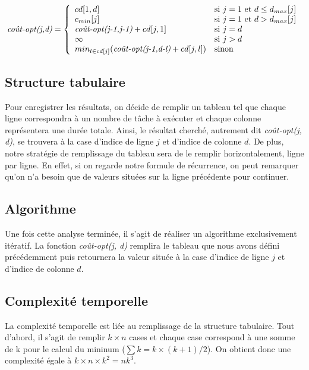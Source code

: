 \documentclass[a4paper, titlepage]{article}
\begin{document}
		$$
		\mbox{\emph{coût-opt(j,d)}} = \left\{
		    \begin{array}{ll}
		        cd[1,d] & \mbox{si } j=1 \mbox{ et } d \le d_{max}[j] \\
		        c_{min}[j] & \mbox{si } j=1 \mbox{ et } d > d_{max}[j] \\
		        \mbox{\emph{coût-opt(j-1,j-1)}} + cd[j,1] & \mbox{si } j=d \\
		        \infty & \mbox{si } j>d \\
		        min_{l \in cd[j]}(\mbox{\emph{coût-opt(j-1,d-l)}} + cd[j,l]) & \mbox{sinon} \\
		    \end{array}
		\right.
		$$
		
	\subsection{Structure tabulaire}
		Pour enregistrer les résultats, on décide de remplir un tableau tel que chaque ligne correspondra à un nombre de tâche à exécuter et chaque colonne représentera une durée totale.
		Ainsi, le résultat cherché, autrement dit \emph{coût-opt(j, d)}, se trouvera à la case d'indice de ligne $j$ et d'indice de colonne $d$.
		De plus, notre stratégie de remplissage du tableau sera de le remplir horizontalement, ligne par ligne.
		En effet, si on regarde notre formule de récurrence, on peut remarquer qu'on n'a besoin que de valeurs situées sur la ligne précédente pour continuer.
	
	\subsection{Algorithme}
		Une fois cette analyse terminée, il s'agit de réaliser un algorithme exclusivement itératif.
		La fonction \emph{coût-opt(j, d)} remplira le tableau que nous avons défini précédemment puis retournera la valeur située à la case d'indice de ligne $j$ et d'indice de colonne $d$.
		
	\subsection{Complexité temporelle}
		La complexité temporelle est liée au remplissage de la structure tabulaire.
		Tout d'abord, il s'agit de remplir $k \times n$ cases et chaque case correspond à une somme de k pour le calcul du mininum ($\sum k = k\times(k+1)/2$).
		On obtient donc une complexité égale à $k \times n \times k^2 = nk^3$.
		
\end{document}
